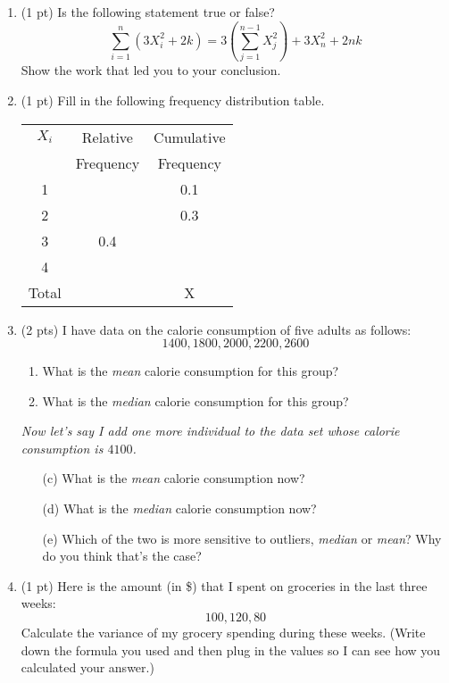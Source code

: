 \documentclass{./../../Latex/handout}
\begin{document}
\thispagestyle{plain}

\begin{enumerate}
\setlength\itemsep{2em}
\item (1 pt) Is the following statement true or false?   $$ \sum_{i=1}^n (3X_i^2 + 2k) = 3 \left(\sum_{j=1}^{n-1}X^2_j \right) + 3 X^2_n + 2nk $$ 
Show the work that led you to your conclusion.

\item (1 pt) Fill in the following frequency distribution table.  

\begin{center}
\begin{tabular}{|c|c|c|}
\hline
$X_i$ & Relative & Cumulative \\
& Frequency & Frequency \\
\hline
1 & & 0.1 \\
\hline
2 & & 0.3 \\
\hline
3 & 0.4 &  \\
\hline
4 & & \\
\hline
Total & & X \\
\hline
\end{tabular}
\end{center}
\item (2 pts) I have data on the calorie consumption of five adults as follows:  
$$ 1400, 1800, 2000, 2200, 2600 $$
\begin{enumerate}
\item What is the \textit{mean} calorie consumption for this group?
\item What is the \textit{median} calorie consumption for this group? 
\end{enumerate}
\textit{Now let's say I add one more individual to the data set whose calorie consumption is $4100$.}
\begin{enumerate}
\item[(c)] What is the \textit{mean} calorie consumption now?
\item[(d)]  What is the \textit{median} calorie consumption now?
\item[(e)] Which of the two is more sensitive to outliers, \textit{median} or \textit{mean}? Why do you think that's the case?
\end{enumerate}

\item (1 pt) Here is the amount (in \$) that I spent on groceries in the last three weeks: 
$$ 100, 120, 80  $$
Calculate the variance of my grocery spending during these weeks. (Write down the formula you used and then plug in the values so I can see how you calculated your answer.)


\end{enumerate}
\end{document}
